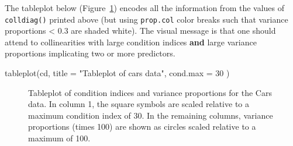 \documentclass[
  letterpaper,
  10pt,
  krantz2]{krantz}
\makeatletter
\newenvironment{Shaded}{\begin{snugshade}}{\end{snugshade}}
\newcommand{\AttributeTok}[1]{\textcolor[rgb]{0.40,0.45,0.13}{#1}}
\newcommand{\DecValTok}[1]{\textcolor[rgb]{0.68,0.00,0.00}{#1}}
\newcommand{\FunctionTok}[1]{\textcolor[rgb]{0.28,0.35,0.67}{#1}}
\newcommand{\NormalTok}[1]{\textcolor[rgb]{0.00,0.23,0.31}{#1}}
\newcommand{\StringTok}[1]{\textcolor[rgb]{0.13,0.47,0.30}{#1}}
\newenvironment{kframe}{%
  \medskip{}
  \setlength{\fboxsep}{.8em}
  \def\at@end@of@kframe{}%
  \ifinner\ifhmode%
  \def\at@end@of@kframe{\end{minipage}}%
  \begin{minipage}{\columnwidth}%
  \fi\fi%
  \def\FrameCommand##1{\hskip\@totalleftmargin \hskip-\fboxsep
  \colorbox{shadecolor}{##1}\hskip-\fboxsep
      \hskip-\linewidth \hskip-\@totalleftmargin \hskip\columnwidth}%
  \MakeFramed {\advance\hsize-\width
    \@totalleftmargin\z@ \linewidth\hsize
    \@setminipage}}%
{\par\unskip\endMakeFramed%
  \at@end@of@kframe}
\renewenvironment{Shaded}{\begin{kframe}}{\end{kframe}}
\makeatother
\begin{document}
The tableplot below (Figure~\ref{fig-cars-tableplot}) encodes all the
information from the values of \texttt{colldiag()} printed above (but
using \texttt{prop.col} color breaks such that variance proportions
\textless{} 0.3 are shaded white). The visual message is that one should
attend to collinearities with large condition indices \textbf{and} large
variance proportions implicating two or more predictors.

\begin{Shaded}
\begin{Highlighting}[]
\FunctionTok{tableplot}\NormalTok{(cd, }\AttributeTok{title =} \StringTok{"Tableplot of cars data"}\NormalTok{, }\AttributeTok{cond.max =} \DecValTok{30}\NormalTok{ )}
\end{Highlighting}
\end{Shaded}

\begin{figure}[H]


\caption{\label{fig-cars-tableplot}Tableplot of condition indices and
variance proportions for the Cars data. In column 1, the square symbols
are scaled relative to a maximum condition index of 30. In the remaining
columns, variance proportions (times 100) are shown as circles scaled
relative to a maximum of 100.}

\end{figure}%
\end{document}
